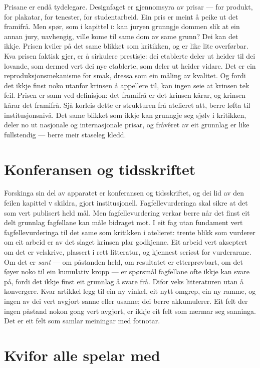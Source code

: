 Prisane er endå tydelegare. Designfaget er gjennomsyra av prisar — for produkt, for plakatar, for tenester, for studentarbeid. Ein pris er meint å peike ut det framifrå. Men spør, som i kapittel \textsc{i}: kan juryen grunngje dommen slik at ein annan jury, uavhengig, ville kome til same dom av same grunn? Dei kan det ikkje. Prisen kviler på det same blikket som kritikken, og er like lite overførbar. Kva prisen faktisk gjer, er å sirkulere prestisje: dei etablerte deler ut heider til dei lovande, som dermed vert dei nye etablerte, som deler ut heider vidare. Det er ein reproduksjonsmekanisme for smak, dressa som ein måling av kvalitet. Og fordi det ikkje finst noko utanfor krinsen å appellere til, kan ingen seie at krinsen tek feil. Prisen er sann ved definisjon: det framifrå er det krinsen kårar, og krinsen kårar det framifrå. Sjå korleis dette er strukturen frå atelieret att, berre løfta til institusjonsnivå. Det same blikket som ikkje kan grunngje seg sjølv i kritikken, deler no ut nasjonale og internasjonale prisar, og fråvêret av eit grunnlag er like fullstendig — berre meir staseleg kledd.

\section{Konferansen og tidsskriftet}

Forskinga sin del av apparatet er konferansen og tidsskriftet, og dei lid av den feilen kapittel \textsc{v} skildra, gjort institusjonell. Fagfellevurderinga skal sikre at det som vert publisert held mål. Men fagfellevurdering verkar berre når det finst eit delt grunnlag fagfellane kan måle bidraget mot. I eit fag utan fundament vert fagfellevurderinga til det same som kritikken i atelieret: trente blikk som vurderer om eit arbeid er av det slaget krinsen plar godkjenne. Eit arbeid vert akseptert om det er velskrive, plassert i rett litteratur, og kjennest seriøst for vurderarane. Om det er \emph{sant} — om påstanden held, om resultatet er etterprøvbart, om det føyer noko til ein kumulativ kropp — er spørsmål fagfellane ofte ikkje kan svare på, fordi det ikkje finst eit grunnlag å svare frå. Difor veks litteraturen utan å konvergere. Kvar artikkel legg til ein ny vinkel, eit nytt omgrep, ein ny ramme, og ingen av dei vert avgjort sanne eller usanne; dei berre akkumulerer. Eit felt der ingen påstand nokon gong vert avgjort, er ikkje eit felt som nærmar seg sanninga. Det er eit felt som samlar meiningar med fotnotar.

\section{Kvifor alle spelar med}

